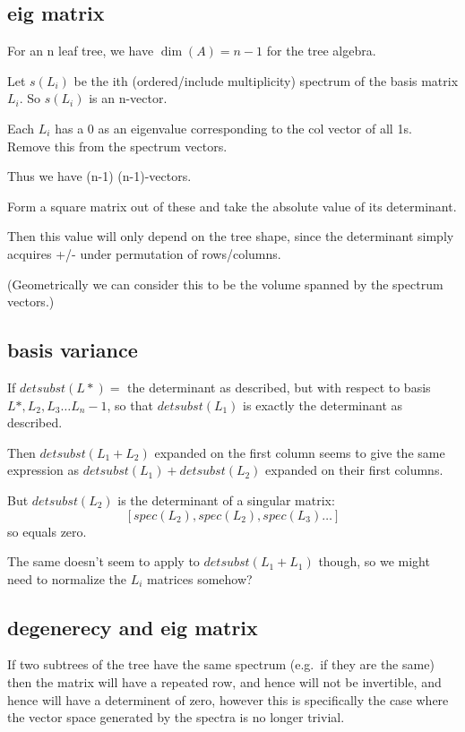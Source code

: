 \documentclass{report}
\begin{document}
\subsection{eig matrix}

For an n leaf tree, we have $\dim(A)=n-1$ for the tree algebra.

Let $s(L_i)$ be the ith (ordered/include multiplicity) spectrum of the basis
matrix $L_i$. So $s(L_i)$ is an n-vector.

Each $L_i$ has a 0 as an eigenvalue corresponding to the col vector of all 1s.
Remove this from the spectrum vectors.

Thus we have (n-1) (n-1)-vectors.

Form a square matrix out of these and take the absolute value of its
determinant.

Then this value will only depend on the tree shape, since the determinant simply acquires +/- under permutation of rows/columns.

(Geometrically we can consider this to be the volume spanned by the spectrum vectors.)



\subsection{basis variance}

If $detsubst(L*) =$ the determinant as described, but with respect to basis
$L*, L_2, L_3\ldots L_n-1$, so that $detsubst(L_1)$ is exactly the
determinant as described.

Then $detsubst(L_1 + L_2)$ expanded on the first column seems to give the same
expression as $detsubst(L_1) + detsubst(L_2)$ expanded on their first columns.

But $detsubst(L_2)$ is the determinant of a singular matrix:
\[[spec(L_2), spec(L_2), spec(L_3)\ldots]\]
so equals zero.

The same doesn't seem to apply to $detsubst(L_1 + L_1)$ though, so we might
need to normalize the $L_i$ matrices somehow?



\subsection{degenerecy and eig matrix}

If two subtrees of the tree have the same spectrum (e.g.\ if they are the same)
then the matrix will have a repeated row, and hence will not be invertible, and
hence will have a determinent of zero, however this is specifically the case
where the vector space generated by the spectra is no longer trivial.
\end{document}
